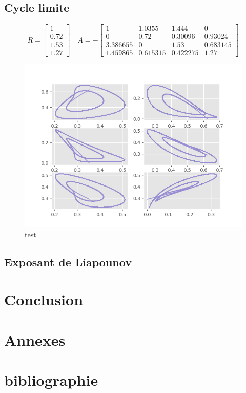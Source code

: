 \documentclass{wsdcr}
\begin{document}
\subsection{Cycle limite}
\begin{equation}
R={\begin{bmatrix}1\\0.72\\1.53\\1.27\end{bmatrix}}\quad A =-{\begin{bmatrix}1&1.0355&1.444&0\\0&0.72&0.30096&0.93024\\3.386655&0&1.53&0.683145\\1.459865&0.615315&0.422275&1.27\end{bmatrix}}
\end{equation}
\begin{figure}[t!]
    \centering
    \includegraphics[width=\linewidth]{fig/lv4_cl.png}
    \caption{test}
    \label{fig:example}
\end{figure}
\subsection{Exposant de Liapounov}
\section{Conclusion}

\section{Annexes}
\section{bibliographie}
\nocite{*}
\printbibliography



%
\end{document}
